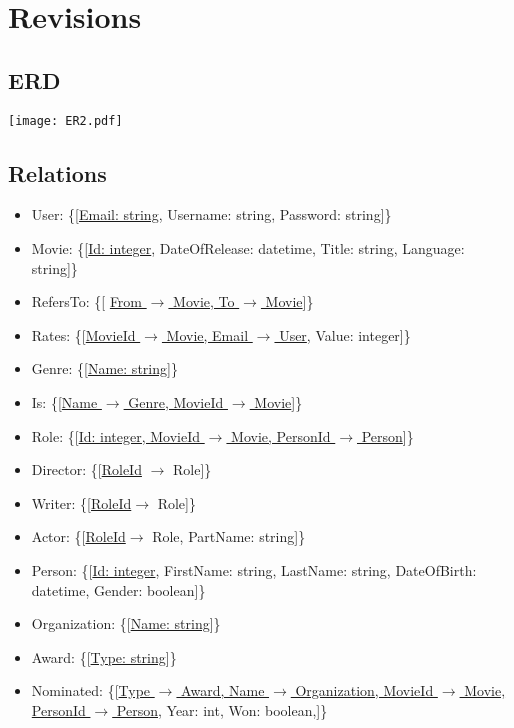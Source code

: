 \section{Revisions}

\subsection{ERD}
\texttt{[image: ER2.pdf]}

\subsection{Relations}
\begin{itemize}
\item User: \{[\underline{Email: string}, Username: string, Password: string]\}

\item Movie: \{[\underline{Id: integer}, DateOfRelease: datetime, Title: string, Language: string]\}

\item RefersTo: \{[ \underline{From $\rightarrow$ Movie, To $\rightarrow$ Movie}]\}

\item Rates: \{[\underline{MovieId $\rightarrow$ Movie, Email $ \rightarrow $ User}, Value: integer]\}

\item Genre: \{[\underline{Name: string}]\}

\item Is: \{[\underline{Name $\rightarrow$ Genre, MovieId $\rightarrow$ Movie}]\}

\item Role: \{[\underline{Id: integer, MovieId $\rightarrow$ Movie, PersonId $ \rightarrow $ Person}]\}

\item Director: \{[\underline{RoleId} $ \rightarrow $ Role]\}

\item Writer: \{[\underline{RoleId}$ \rightarrow $ Role]\}

\item Actor: \{[\underline{RoleId}$ \rightarrow $ Role, PartName: string]\}

\item Person: \{[\underline{Id: integer}, FirstName: string, LastName: string, DateOfBirth: datetime, Gender: boolean]\}

\item Organization: \{[\underline{Name: string}]\}

\item Award: \{[\underline{Type: string}]\}

\item Nominated: \{[\underline{Type $ \rightarrow $ Award, Name $ \rightarrow $ Organization, MovieId $\rightarrow$ Movie,}\\
\underline{PersonId $ \rightarrow $ Person}, Year: int, Won: boolean,]\}
\end{itemize}

